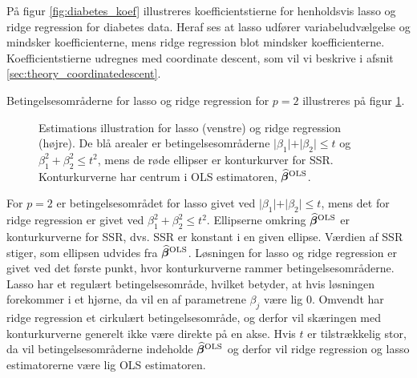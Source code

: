 %
\begin{eks}
På figur \ref{fig:diabetes_koef} illustreres koefficientstierne for henholdsvis lasso og ridge regression for diabetes data.
Heraf ses at lasso udfører variabeludvælgelse og mindsker koefficienterne, mens ridge regression blot mindsker koefficienterne.
Koefficientstierne udregnes med coordinate descent, som vil vi beskrive i afsnit \ref{sec:theory_coordinatedescent}.
%

\end{eks}

Betingelsesområderne for lasso og ridge regression for \(p=2\) illustreres på figur \ref{fig:LassoRig}.
%
\begin{figure}[H]
\centering
\begin{minipage}{0.4\linewidth}
\scalebox{0.7}{}
\end{minipage}
\hspace{0.2cm}
\begin{minipage}{0.4\linewidth}
\scalebox{0.7}{}
\end{minipage}
\caption{Estimations illustration for lasso (venstre) og ridge regression (højre). 
De blå arealer er betingelsesområderne $\vert \beta_1 \vert+\vert \beta_2 \vert \leq t$ og $\beta_1^2+\beta_2^2 \leq t^2$, mens de røde ellipser er konturkurver for SSR. Konturkurverne har centrum i OLS estimatoren, $\widehat{\boldsymbol{\beta}}^\text{OLS}$.} \label{fig:LassoRig}
\end{figure}
%
For $p=2$ er betingelsesområdet for lasso givet ved $\vert \beta_1 \vert + \vert \beta_2 \vert \leq t$, mens det for ridge regression er givet ved $\beta_1^2 + \beta_2^2 \leq t^2$.
Ellipserne omkring $\widehat{\boldsymbol{\beta}}^{\text{OLS}}$ er konturkurverne for SSR, dvs. SSR er konstant i en given ellipse. Værdien af SSR stiger, som ellipsen udvides fra $\widehat{\boldsymbol{\beta}}^{\text{OLS}}$.
Løsningen for lasso og ridge regression er givet ved det første punkt, hvor konturkurverne rammer betingelsesområderne.
Lasso har et regulært betingelsesområde, hvilket betyder, at hvis løsningen forekommer i et hjørne, da vil en af parametrene $\beta_j$ være lig 0.
Omvendt har ridge regression et cirkulært betingelsesområde, og derfor vil skæringen med konturkurverne generelt ikke være direkte på en akse.
Hvis $t$ er tilstrækkelig stor, da vil betingelsesområderne indeholde $\widehat{\boldsymbol{\beta}}^{\text{OLS}}$ og derfor vil ridge regression og lasso estimatorerne være lig OLS estimatoren.
